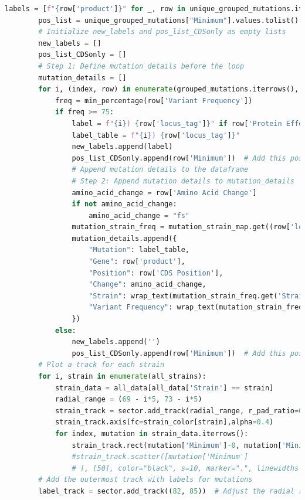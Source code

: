 \documentclass[12pt]{article}
\begin{document}
\begin{lstlisting}[language=Python]
        labels = [f"{row['product']}" for _, row in unique_grouped_mutations.iterrows()]
        pos_list = unique_grouped_mutations["Minimum"].values.tolist()
        # Initialize new_labels and pos_list_CDSonly as empty lists
        new_labels = []
        pos_list_CDSonly = []
        # Step 1: Define mutation_details before the loop
        mutation_details = []
        for i, (index, row) in enumerate(grouped_mutations.iterrows(), start=1):
            freq = min_percentage(row['Variant Frequency'])
            if freq >= 75:
                label = f"{i}) {row['locus_tag']}" if row['Protein Effect'] not in [None, ''] else ''
                label_table = f"{i}) {row['locus_tag']}"
                new_labels.append(label)
                pos_list_CDSonly.append(row['Minimum'])  # Add this position to pos_list_CDSonly
                # Append mutation details to the dataframe
                # Step 2: Append mutation details to mutation_details
                amino_acid_change = row['Amino Acid Change']
                if not amino_acid_change:
                    amino_acid_change = "fs"
                mutation_strain_freq = mutation_strain_map.get((row['locus_tag'], row['Minimum'], row['Change']), {})
                mutation_details.append({
                    "Mutation": label_table,
                    "Gene": row['product'],
                    "Position": row['CDS Position'],
                    "Change": amino_acid_change,
                    "Strain": wrap_text(mutation_strain_freq.get('Strain', ''), 15),
                    "Variant Frequency": wrap_text(mutation_strain_freq.get('Variant Frequency', ''), 15)
                })
            else:
                new_labels.append('')
                pos_list_CDSonly.append(row['Minimum'])  # Add this position to pos_list_CDSonly
        # Plot a track for each strain
        for i, strain in enumerate(all_strains):
            strain_data = all_data[all_data['Strain'] == strain]
            radial_range = (69 - i*5, 73 - i*5)
            strain_track = sector.add_track(radial_range, r_pad_ratio=0.1)
            strain_track.axis(fc=strain_color[strain],alpha=0.4)
            for index, mutation in strain_data.iterrows():
                strain_track.rect(mutation['Minimum']-0, mutation['Minimum']+1000, fc="white", ec=strain_color[strain], alpha=0.8, lw=1)
                #strain_track.scatter([mutation['Minimum']
                # ], [50], color="black", s=10, marker=".", linewidths =0.5, ec="black")
        # Add the outermost track with labels for mutations
        label_track = sector.add_track((82, 85))  # Adjust the radial range as needed


\end{lstlisting}
\end{document}
